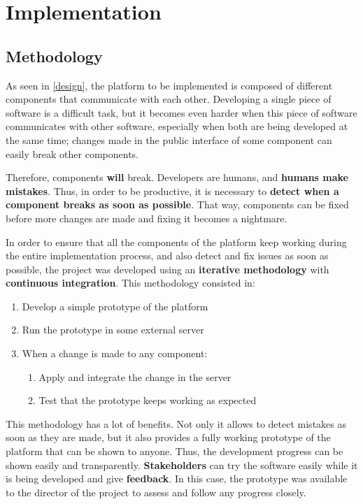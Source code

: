 \documentclass[a4paper,11pt,titlepage,abstract,numbers=noenddot,automark,mnsy,intlimits,rgb,dvipsnames]{report}
\begin{document}
\part{Implementation}
\chapter{Methodology}
\label{methodology}
As seen in \autoref{design}, the platform to be implemented is composed of different components that communicate with
each other. Developing a single piece of software is a difficult task, but it becomes even harder when this piece of software
communicates with other software, especially when both are being developed at the same time; changes made in
the public interface of some component can easily break other components.

Therefore, components \textbf{will} break. Developers are humans, and \textbf{humans make mistakes}. Thus, in order to be productive,
it is necessary to \textbf{detect when a component breaks as soon as possible}. That way, components can be fixed before more changes
are made and fixing it becomes a nightmare.

In order to ensure that all the components of the platform keep working during the entire implementation process, and also
detect and fix issues as soon as possible, the project was developed using an \textbf{iterative methodology} with
\textbf{continuous integration}. This methodology consisted in:
\begin{enumerate}
\item
Develop a simple prototype of the platform
\item
Run the prototype in some external server
\item
When a change is made to any component:
\begin{enumerate}
\item
Apply and integrate the change in the server
\item
Test that the prototype keeps working as expected
\end{enumerate}
\end{enumerate}
This methodology has a lot of benefits. Not only it allows to detect mistakes as soon as they are made, but it also provides
a fully working prototype of the platform that can be shown to anyone. Thus, the development progress can be shown easily and
transparently. \textbf{Stakeholders} can try the software easily while it is being developed and give \textbf{feedback}. In this case,
the prototype was available to the director of the project to assess and follow any progress closely.
\end{document}
